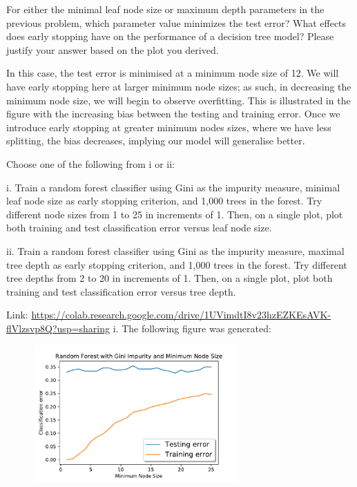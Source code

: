 \problem[6]
For either the minimal leaf node size or maximum depth parameters in the previous problem, which parameter value minimizes the test error? What effects does early stopping have on the performance of a decision tree model?
Please justify your answer based on the plot you derived.

\begin{solution}
   In this case, the test error is minimised at a minimum node size of 12. We will have early stopping here at larger minimum node sizes; as such, in decreasing the minimum node size, we will begin to observe overfitting. This is illustrated in the figure with the increasing bias between the testing and training error. Once we introduce early stopping at greater minimum nodes sizes, where we have less splitting, the bias decreases, implying our model will generalise better.
\end{solution}

\indent\problem[4] Choose one of the following from i or ii: \smallskip 

\noindent i. Train a random forest classifier using Gini as the impurity measure, minimal leaf node size as early stopping criterion, and 1,000 trees in the forest. Try different node sizes from 1 to 25 in increments of 1. Then, on a single plot, plot both training and test classification error versus
leaf node size.

ii. Train a random forest classifier using Gini as the impurity measure, maximal tree depth as early stopping criterion, and 1,000 trees in the forest. Try different tree depths from 2 to 20 in increments of 1. Then, on a single plot, plot both training and test classification error versus tree depth.

\begin{solution}
    Link: \url{https://colab.research.google.com/drive/1UVimdtI8v23hzEZKEsAVK-flVlzsvp8Q?usp=sharing}
    i. The following figure was generated:
    \begin{figure}[H]
        \begin{center}
        \includegraphics[width=0.7\textwidth]{RT_min_leaf.pdf}
        \end{center}
        \end{figure}
\end{solution}

